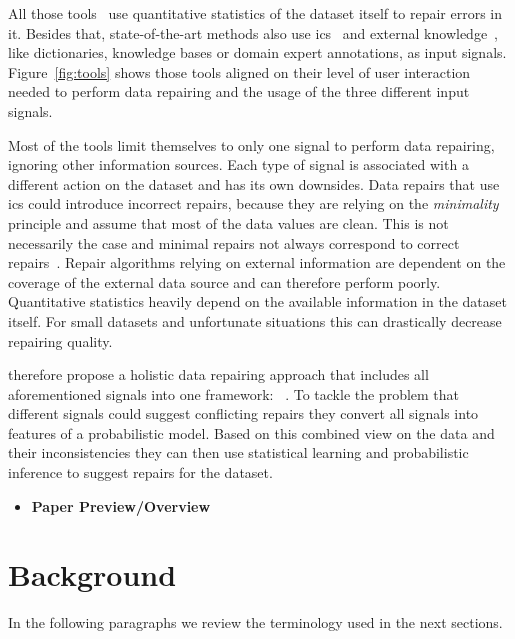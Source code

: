   All those tools~\cite{scare,potters_wheel,data_wrangler,trifacta_wrangler} use quantitative statistics of the dataset itself to repair errors in it.
  Besides that, state-of-the-art methods also use \glspl{ic}~\cite{ajax,gdr,editing_rules,data_tamer} and external knowledge~\cite{katara}, like dictionaries, knowledge bases or domain expert annotations, as input signals.
  Figure~\ref{fig:tools} shows those tools aligned on their level of user interaction needed to perform data repairing and the usage of the three different input signals.

  \begin{figure*}[hbt]
    \centering
    
    \caption{Data Repairing Tools in Context}
    \label{fig:tools}
  \end{figure*}

  \bigskip
  Most of the tools limit themselves to only one signal to perform data repairing, ignoring other information sources.
  Each type of signal is associated with a different action on the dataset and has its own downsides.
  Data repairs that use \glspl{ic} could introduce incorrect repairs, because they are relying on the \textit{minimality} principle and assume that most of the data values are clean.
  This is not necessarily the case and minimal repairs not always correspond to correct repairs~\cite{holoclean}.
  Repair algorithms relying on external information are dependent on the coverage of the external data source and can therefore perform poorly.
  Quantitative statistics heavily depend on the available information in the dataset itself.
  For small datasets and unfortunate situations this can drastically decrease repairing quality.
  
  \citeauthor{holoclean} therefore propose a holistic data repairing approach that includes all aforementioned signals into one framework: \holoclean{}~\cite{holoclean}.
  To tackle the problem that different signals could suggest conflicting repairs they convert all signals into features of a probabilistic model.
  Based on this combined view on the data and their inconsistencies they can then use statistical learning and probabilistic inference to suggest repairs for the dataset.
  
  \begin{itemize}
    \item \textbf{Paper Preview/Overview}
  \end{itemize}


\section{Background}\label{sec:background}
  In the following paragraphs we review the terminology used in the next sections.
  
